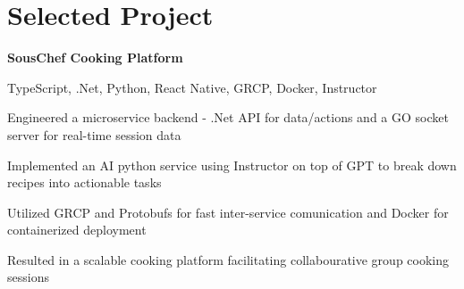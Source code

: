 
\newenvironment{twocolentry_proj}[2][]{
    \onecolentry
    \def\secondColumn{#2}
    \setcolumnwidth{\fill, 7 cm}
    \begin{paracol}{2}
}{
    \switchcolumn \raggedleft \secondColumn
    \end{paracol}
    \endonecolentry
} %

\vspace{5 pt - 0.4 cm}
\section{Selected Project}
\begin{twocolentry_proj}{
    \mbox{}%
}

\textbf{SousChef Cooking Platform}
\end{twocolentry_proj}

\vspace{0.10 cm}
\begin{onecolentry}
    \small TypeScript, .Net, Python, React Native, GRCP, Docker, Instructor 
    \begin{highlights}
        \item Engineered a microservice backend - .Net API for data/actions and a GO socket server for real-time session data
        \item Implemented an AI python service using Instructor on top of GPT to break down recipes into actionable tasks
        \item Utilized GRCP and Protobufs for fast inter-service comunication and Docker for containerized deployment
        \item Resulted in a scalable cooking platform facilitating collabourative group cooking sessions
    \end{highlights}
\end{onecolentry}
